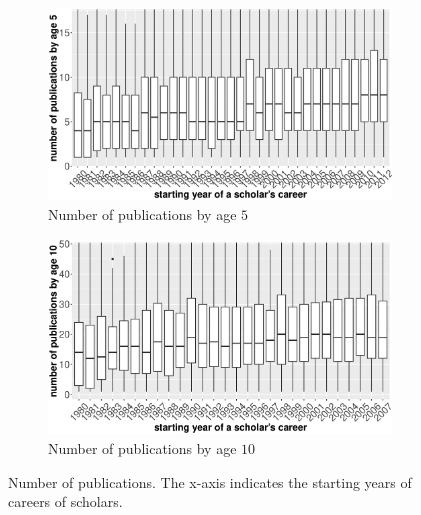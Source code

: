 \begin{refsection}
\begin{figure}[h!]
     \centering
     \begin{subfigure}[b]{0.48\textwidth}
         \centering
         \includegraphics[width=\textwidth]{figures/exploratory/npub_age5.eps}
         \caption{Number of publications by age $5$}
     \end{subfigure}
     \hfill
     \begin{subfigure}[b]{0.48\textwidth}
         \centering
         \includegraphics[width=\textwidth]{figures/exploratory/npub_age10.eps}
         \caption{Number of publications by age $10$}
     \end{subfigure}
    \caption{Number of publications. The x-axis indicates the starting years of careers of scholars. }
    \label{fig:npub}
\end{figure}



\end{refsection}
